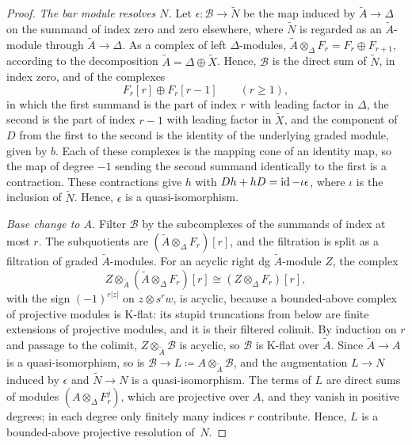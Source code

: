 \begin{proof}
  \emph{The bar module resolves $N$.} Let ${\epsilon\colon\mathcal{B}\to
  \widetilde{N}}$ be the map induced by ${\widetilde{A}\to\Delta}$ on the summand
  of index zero and zero elsewhere, where $\widetilde{N}$ is regarded as an
  $\widetilde{A}$-module through ${\widetilde{A}\to\Delta}$. As a complex of
  left $\Delta$-modules, ${\widetilde{A}\otimes_\Delta F_r=F_r\oplus F_{r+1}}$,
  according to the decomposition ${\widetilde{A}=\Delta\oplus\widetilde{X}}$.
  Hence, $\mathcal{B}$ is the direct sum of $\widetilde{N}$, in index zero, and
  of the complexes
  \[
    F_r[r]\oplus F_r[r-1]\qquad(r\geq1),
  \]
  in which the first summand is the part of index $r$ with leading factor in
  $\Delta$, the second is the part of index ${r-1}$ with leading factor in
  $\widetilde{X}$, and the component of $D$ from the first to the second is the
  identity of the underlying graded module, given by $b$. Each of these
  complexes is the mapping cone of an identity map, so the map of degree ${-1}$
  sending the second summand identically to the first is a contraction. These
  contractions give $h$ with ${Dh+hD=\id-\iota\epsilon}$, where $\iota$ is the
  inclusion of $\widetilde{N}$. Hence, $\epsilon$ is a quasi-isomorphism.

  \emph{Base change to $A$.} Filter $\mathcal{B}$ by the subcomplexes of the
  summands of index at most $r$. The subquotients are
  ${(\widetilde{A}\otimes_\Delta F_r)[r]}$, and the filtration is split as a
  filtration of graded $\widetilde{A}$-modules. For an acyclic right dg
  $\widetilde{A}$-module $Z$, the complex
  \[
    Z\otimes_{\widetilde{A}}(\widetilde{A}\otimes_\Delta F_r)[r]\cong
    (Z\otimes_\Delta F_r)[r],
  \]
  with the sign ${(-1)^{r|z|}}$ on ${z\otimes s^rw}$, is acyclic, because a
  bounded-above complex of projective modules is K-flat: its stupid truncations
  from below are finite extensions of projective modules, and it is their
  filtered colimit. By induction on $r$ and passage to the colimit,
  ${Z\otimes_{\widetilde{A}}\mathcal{B}}$ is acyclic, so $\mathcal{B}$ is K-flat
  over $\widetilde{A}$. Since ${\widetilde{A}\to A}$ is a quasi-isomorphism, so is
  ${\mathcal{B}\to L\coloneqq A\otimes_{\widetilde{A}} \mathcal{B}}$, and the
  augmentation ${L\to N}$ induced by $\epsilon$ and ${\widetilde{N}\to N}$ is a
  quasi-isomorphism. The terms of $L$ are direct sums of modules
  ${(A\otimes_\Delta F_r^j)}$, which are projective over $A$, and they vanish in
  positive degrees; in each degree only finitely many indices $r$ contribute.
  Hence, $L$ is a bounded-above projective resolution of~$N$.


\end{proof}
